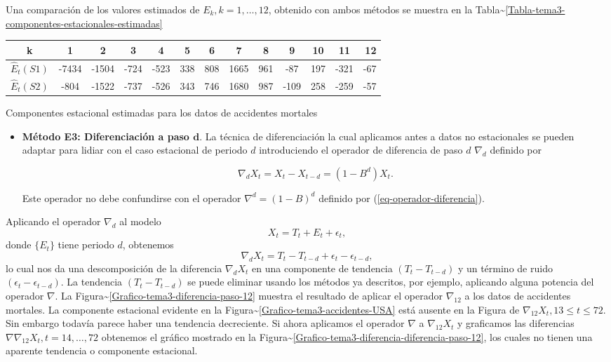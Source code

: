 \documentclass[12pt,]{krantz}
\providecommand{\tightlist}{%
  \setlength{\itemsep}{0pt}\setlength{\parskip}{0pt}}
\theoremstyle{definition}
\theoremstyle{definition}
\theoremstyle{definition}
\theoremstyle{remark}
\begin{document}
Una comparación de los valores estimados de \(E_k, k=1,\ldots,12\),
obtenido con ambos métodos se muestra en la
Tabla\textasciitilde{}\ref{Tabla-tema3-componentes-estacionales-estimadas}

\begin{longtable}[]{@{}ccccccccccccr@{}}
\toprule
k & 1 & 2 & 3 & 4 & 5 & 6 & 7 & 8 & 9 & 10 & 11 & 12\tabularnewline
\midrule
\endhead
\(\hat{E}_t(S1)\) & -7434 & -1504 & -724 & -523 & 338 & 808 & 1665 & 961
& -87 & 197 & -321 & -67\tabularnewline
\(\hat{E}_t(S2)\) & -804 & -1522 & -737 & -526 & 343 & 746 & 1680 & 987
& -109 & 258 & -259 & -57\tabularnewline
\bottomrule
\end{longtable}

Componentes estacional estimadas para los datos de accidentes mortales

\begin{itemize}
\tightlist
\item
  \textbf{Método E3: Diferenciación a paso \(\mathbf{d}\)}. La técnica
  de diferenciación la cual aplicamos antes a datos no estacionales se
  pueden adaptar para lidiar con el caso estacional de periodo \(d\)
  introduciendo el operador de diferencia de paso \(d\) \(\nabla_d\)
  definido por

  \begin{equation}
  \nabla_dX_t = X_t-X_{t-d} = (1-B^d)X_t.
  \label{eq:eq-operador-diferencia-paso-d}
  \end{equation}

  Este operador no debe confundirse con el operador
  \(\nabla^d = (1-B)^d\) definido por (\ref{eq-operador-diferencia}).
\end{itemize}

Aplicando el operador \(\nabla_d\) al modelo
\[X_t = T_t + E_t + \epsilon_t,\] donde \(\{E_t\}\) tiene periodo \(d\),
obtenemos \[\nabla_dX_t = T_t-T_{t-d} + \epsilon_t-\epsilon_{t-d},\] lo
cual nos da una descomposición de la diferencia \(\nabla_dX_t\) en una
componente de tendencia \((T_t-T_{t-d})\) y un término de ruido
\((\epsilon_t-\epsilon_{t-d})\). La tendencia \((T_t-T_{t-d})\) se puede
eliminar usando los métodos ya descritos, por ejemplo, aplicando alguna
potencia del operador \(\nabla\). La
Figura\textasciitilde{}\ref{Grafico-tema3-diferencia-paso-12} muestra el
resultado de aplicar el operador \(\nabla_{12}\) a los datos de
accidentes mortales. La componente estacional evidente en la
Figura\textasciitilde{}\ref{Grafico-tema3-accidentes-USA} está ausente
en la Figura de \(\nabla_{12}X_t,13\leq t\leq72\). Sin embargo todavía
parece haber una tendencia decreciente. Si ahora aplicamos el operador
\(\nabla\) a \(\nabla_{12}X_t\) y graficamos las diferencias
\(\nabla\nabla_{12}X_t,t=14,\ldots,72\) obtenemos el gráfico mostrado en
la
Figura\textasciitilde{}\ref{Grafico-tema3-diferencia-diferencia-paso-12},
los cuales no tienen una aparente tendencia o componente estacional.
\end{document}
